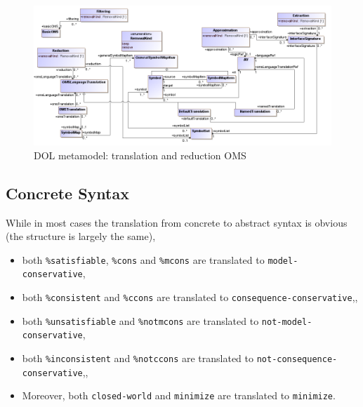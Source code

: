 \documentclass[10pt,fleqn,final]{scrreprt}
\makeatletter
\newcommand*\CommentAuthor{}
\renewcommand*\CommentAuthor{#1}}
\newcommand*\CommentDate{}
\renewcommand*\CommentDate{#1}}
\newcommand*\CommentId{}
\renewcommand*\CommentId{#1}}
\newcommand*\CommentType{}
\renewcommand*\CommentType{#1}}
\newcommand*{\SetCommentColorByType}[1]{%
\edef\localType{{#1}}%
\expandafter\ifstrequal\localType{q-aut}{\colorlet{CommentColor}{red}}{%
\expandafter\ifstrequal\localType{q-all}{\colorlet{CommentColor}{orange}}{%
\expandafter\ifstrequal\localType{todo}{\colorlet{CommentColor}{orange}}{%
\expandafter\ifstrequal\localType{fyi}{\colorlet{CommentColor}{lightgray}}{%
\colorlet{CommentColor}{yellow}}}}}}
\newcommand*{\SetCommentPrefixByType}[1]{%
\edef\localType{{#1}}%
\expandafter\@ifmtarg\localType{%
\edef\CommentPrefix{}%
}{%
\caseupper[q]{#1}%
\edef\CommentPrefix{\thestring: }%
}}
\newcommand*{\initComment}[1]{%
\setkeys{Comment}{#1}%
\SetCommentColorByType{\CommentType}%
\relax%
\SetCommentPrefixByType{\CommentType}%
\relax%
}
\newcommand*{\todonote}[2][]{%
\initComment{#1}%
\pdfcomment[author=\CommentAuthor,color=CommentColor,date=\CommentDate,id=\CommentId]{%
\CommentPrefix
#2}}
\renewcommand*{\todonote}[2][]{%
\initComment{#1}%
\ednote{\CommentPrefix #2}}
\newcommand*{\CLnote}[2][author=Christoph Lange]{%
\todonote[author=Christoph Lange,#1]{#2} 
}
\newcommand*{\syntax}[1]{\texttt{#1}}
\newcommand{\ssclause}[1]{\subsection{#1}}
\newenvironment{definitions}[0]{\medskip }{}
\makeatother
\begin{document}
\begin{definitions}
\medskip
\begin{figure}
  \centering
    \includegraphics[scale=0.47]{mof/translation&reduction.png}
  \caption{DOL metamodel: translation and reduction OMS}
  \label{fig:translations&reduction}
\end{figure}





\ssclause{Concrete Syntax} \label{a:dol-text:OMS}


While in most cases the translation from concrete to abstract syntax
is obvious (the structure is largely the same),  
\begin{itemize}
\item both \syntax{\%satisfiable}, \syntax{\%cons} and \syntax{\%mcons} are translated
  to \syntax{model-conservative},
\item both \syntax{\%consistent}  and \syntax{\%ccons} are translated
  to \syntax{consequence-conservative},,
\item  both   \syntax{\%unsatisfiable} and \syntax{\%notmcons} are translated to
  \syntax{not-model-conservative},
\item both \syntax{\%inconsistent}  and \syntax{\%notccons} are translated
  to \syntax{not-consequence-conservative},,
\item Moreover, both \syntax{closed-world} and \syntax{minimize} are
  translated to \syntax{minimize}.
\end{itemize}
                       

\end{definitions}
\end{document}
